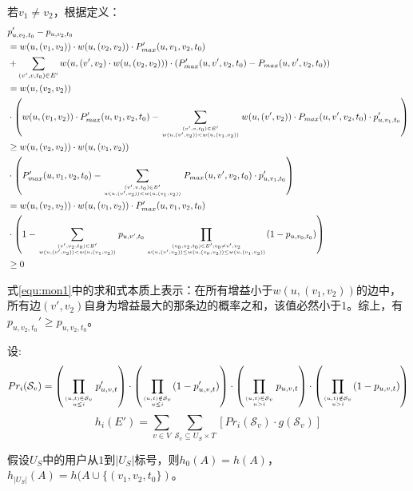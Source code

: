 若$v_1 \ne v_2$，根据定义：
\begin{align}
\small
    &p_{u,v_2,t_0}'-p_{u,v_2,t_0}\\
    &= w(u,(v_1,v_2))\cdot w(u,(v_2,v_2)) \cdot P_{max}'(u,v_1,v_2,t_0) \nonumber \\
    &+ \sum_{(v',v,t_0)\in E'}w(u,(v',v_2)\cdot w(u,(v_2,v_2))) \cdot(P_{max}'(u,v',v_2,t_0)-P_{max}(u,v',v_2,t_0)) \\ 
    &= w(u,(v_2,v_2)) \nonumber \\ &\cdot \left(w(u,(v_1,v_2)) \cdot P_{max}'(u,v_1,v_2,t_0)-\sum_{(v',v,t_0)\in E' \atop w(u,(v',v_2))<w(u,(v_1,v_2))} w(u,(v',v_2))\cdot P_{max}(u,v',v_2,t_0)\cdot p_{u,v_1,t_0}' \right) \\ 
    &\ge w(u,(v_2,v_2))\cdot w(u,(v_1,v_2)) \nonumber \\ & \cdot  \left(P_{max}'(u,v_1,v_2,t_0)-\sum_{(v',v,t_0)\in E'\atop w(u,(v',v_2))<w(u,(v_1,v_2))}P_{max}(u,v',v_2,t_0)\cdot p_{u,v_1,t_0}'\right) \\ 
    &= w(u,(v_2,v_2))\cdot w(u,(v_1,v_2)) \cdot P_{max}'(u,v_1,v_2,t_0) \nonumber \\& \cdot \left(1-\sum_{(v',v_2,t_0)\in E' \atop w(u,(v',v_2))<w(u,(v_1,v_2))}p_{u,v',t_0}\prod_{(v_0,v_2,t_0)\in E' ; v_0 \ne v',v_2 \atop w(u,(v',v_2))\le w(u,(v_0,v_2)) \le w(u,(v_1,v_2))}(1-p_{u,v_0,t_0})\right)\label{equ:mon1} \\
    &\ge 0
\end{align}

式\ref{equ:mon1}中的求和式本质上表示：在所有增益小于$w(u,(v_1,v_2))$的边中，所有边$(v',v_2)$自身为增益最大的那条边的概率之和，该值必然小于$1$。综上，有$p_{u,v_2,t_0}'\ge p_{u,v_2,t_0}$。

设:
\begin{equation}
Pr_i(\mathcal{S}_v) = \left(\prod_{(u,t)\in \mathcal{S}_v \atop u \le i}p_{u,v,t}'\right)\cdot \left(\prod_{(u,t) \notin \mathcal{S}_v \atop u\le i} (1-p_{u,v,t}')\right)\cdot \left(\prod_{(u,t)\in \mathcal{S}_v \atop u > i}p_{u,v,t}\right)\cdot \left(\prod_{(u,t) \notin \mathcal{S}_v \atop u > i} (1-p_{u,v,t})\right)
\end{equation}
\begin{equation}
h_i(E')= \sum_{v\in V} \sum_{\mathcal{S}_v \subseteq U_S \times T} \left[Pr_i(\mathcal{S}_v)\cdot g(\mathcal{S}_v)\right]
\end{equation}

假设$U_S$中的用户从$1$到$|U_S|$标号，则$h_0(A)=h(A)$，$h_{|U_S|}(A)=h(A\cup\{(v_1,v_2,t_0\})$。

